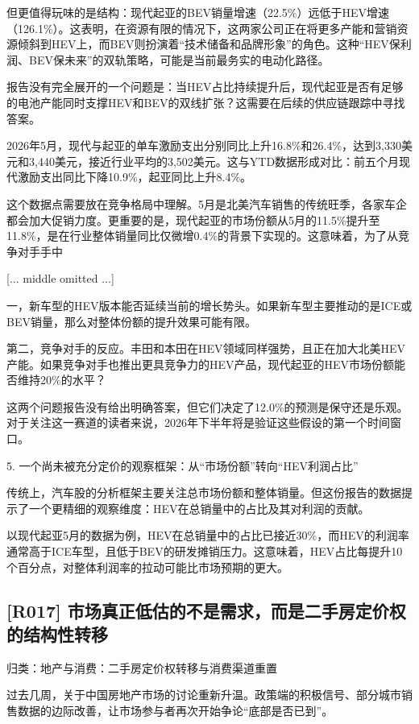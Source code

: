 \documentclass[11pt]{ctexart}
\begin{document}
但更值得玩味的是结构：现代起亚的BEV销量增速（22.5\%）远低于HEV增速（126.1\%）。这表明，在资源有限的情况下，这两家公司正在将更多产能和营销资源倾斜到HEV上，而BEV则扮演着“技术储备和品牌形象”的角色。这种“HEV保利润、BEV保未来”的双轨策略，可能是当前最务实的电动化路径。

报告没有完全展开的一个问题是：当HEV占比持续提升后，现代起亚是否有足够的电池产能同时支撑HEV和BEV的双线扩张？这需要在后续的供应链跟踪中寻找答案。

2026年5月，现代与起亚的单车激励支出分别同比上升16.8\%和26.4\%，达到3,330美元和3,440美元，接近行业平均的3,502美元。这与YTD数据形成对比：前五个月现代激励支出同比下降10.9\%，起亚同比上升8.4\%。

这个数据点需要放在竞争格局中理解。5月是北美汽车销售的传统旺季，各家车企都会加大促销力度。更重要的是，现代起亚的市场份额从5月的11.5\%提升至11.8\%，是在行业整体销量同比仅微增0.4\%的背景下实现的。这意味着，为了从竞争对手手中

[... middle omitted ...]

一，新车型的HEV版本能否延续当前的增长势头。如果新车型主要推动的是ICE或BEV销量，那么对整体份额的提升效果可能有限。

第二，竞争对手的反应。丰田和本田在HEV领域同样强势，且正在加大北美HEV产能。如果竞争对手也推出更具竞争力的HEV产品，现代起亚的HEV市场份额能否维持20\%的水平？

这两个问题报告没有给出明确答案，但它们决定了12.0\%的预测是保守还是乐观。对于关注这一赛道的读者来说，2026年下半年将是验证这些假设的第一个时间窗口。

5. 一个尚未被充分定价的观察框架：从“市场份额”转向“HEV利润占比”

传统上，汽车股的分析框架主要关注总市场份额和整体销量。但这份报告的数据提示了一个更精细的观察维度：HEV在总销量中的占比及其对利润的贡献。

以现代起亚5月的数据为例，HEV在总销量中的占比已接近30\%，而HEV的利润率通常高于ICE车型，且低于BEV的研发摊销压力。这意味着，HEV占比每提升10个百分点，对整体利润率的拉动可能比市场预期的更大。

\subsection{[R017] 市场真正低估的不是需求，而是二手房定价权的结构性转移}
{\small\color{refgray}归类：地产与消费：二手房定价权转移与消费渠道重置}

过去几周，关于中国房地产市场的讨论重新升温。政策端的积极信号、部分城市销售数据的边际改善，让市场参与者再次开始争论“底部是否已到”。
\end{document}
